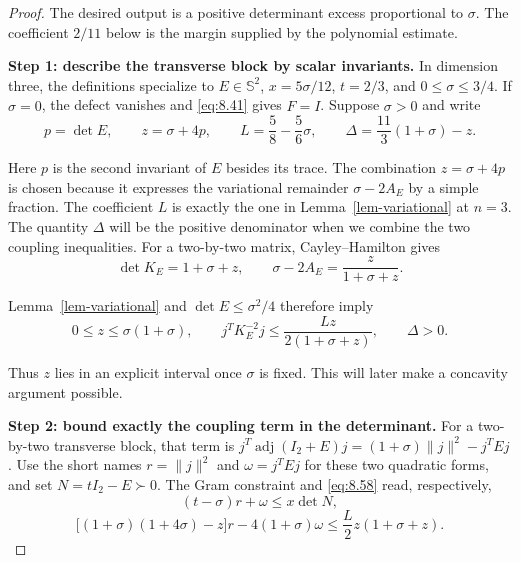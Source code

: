 \begin{proof}
The desired output is a positive determinant excess proportional
to $\sigma$. The coefficient $2/11$ below is the margin supplied by the
polynomial estimate.

\textbf{Step 1: describe the transverse block by scalar invariants.} In dimension
three, the definitions specialize to $E\in\mathbb S^2$, $x=5\sigma/12$,
$t=2/3$, and $0\le\sigma\le3/4$. If $\sigma=0$, the defect vanishes and
\eqref{eq:8.41} gives $\widehat F=I$. Suppose $\sigma>0$ and write
\begin{equation}\label{eq:8.56}
p=\det E,\qquad z=\sigma+4p,\qquad
L=\frac58-\frac56\sigma,\qquad
\Delta=\frac{11}{3}(1+\sigma)-z.
\end{equation}

Here $p$ is the second invariant of $E$ besides its trace. The combination
$z=\sigma+4p$ is chosen because it expresses the variational remainder
$\sigma-2A_E$ by a simple fraction. The coefficient $L$ is exactly the one
in Lemma~\ref{lem-variational} at $n=3$. The quantity $\Delta$ will be the positive denominator
when we combine the two coupling inequalities.
For a two-by-two matrix, Cayley--Hamilton gives
\begin{equation}\label{eq:8.57}
\det K_E=1+\sigma+z,\qquad
\sigma-2A_E=\frac{z}{1+\sigma+z}.
\end{equation}

Lemma~\ref{lem-variational} and $\det E\le\sigma^2/4$ therefore imply
\begin{equation}\label{eq:8.58}
0\le z\le\sigma(1+\sigma),\qquad
j^TK_E^{-2}j\le\frac{Lz}{2(1+\sigma+z)},\qquad \Delta>0.
\end{equation}

Thus $z$ lies in an explicit interval once $\sigma$ is fixed. This will later
make a concavity argument possible.

\textbf{Step 2: bound exactly the coupling term in the determinant.} For a
two-by-two transverse block, that term is
$j^T\operatorname{adj}(I_2+E)j=(1+\sigma)\|j\|^2-j^TEj$.
Use the short names $r=\|j\|^2$ and $\omega=j^TEj$ for these two quadratic
forms, and set $N=tI_2-E\succ0$. The Gram constraint and \eqref{eq:8.58} read, respectively,
\begin{equation}\label{eq:8.59}
(t-\sigma)r+\omega\le x\det N,
\end{equation}
\begin{equation}\label{eq:8.60}
\bigl[(1+\sigma)(1+4\sigma)-z\bigr]r-4(1+\sigma)\omega
\le\frac L2z(1+\sigma+z).
\end{equation}


\end{proof}
